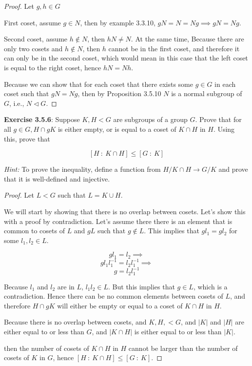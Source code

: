 \documentclass[a4paper]{article}
\begin{document}
\begin{myparindent}{0pt}
\begin{proof}
  Let $g, h \in G$

  First coset, assume $g \in N$, then by example 3.3.10, $gN = N = Ng \implies gN = Ng$.

  Second coset, assume $h \notin N$, then $hN \neq N$. At the same time, Because
  there are only two cosets and $h \notin N$, then $h$ cannot be in the first
  coset, and therefore it can only be in the second coset, which would mean in
  this case that the left coset is equal to the right coset, hence $hN = Nh$. \newline

  Because we can show that for each coset that there exists some $g \in G$ in
  each coset such that $gN = Ng$, then by Proposition 3.5.10 $N$ is a normal
  subgroup of $G$, i.e., $N \triangleleft G$.
\end{proof}

\textbf{Exercise 3.5.6}:
Suppose $K, H < G$ are subgroups of a group $G$. Prove that for all $g \in G,
H \cap gK$ is either empty, or is equal to a coset of $K \cap H$ in $H$. Using
this, prove that

\[ [H ~: ~K \cap H] \le [G ~: ~K] \]

\textit{Hint:} To prove the inequality, define a function from $H/K \cap H
\rightarrow G/K$ and prove that it is well-defined and injective.
\begin{proof}
  Let $L < G$ such that $L = K \cup H$.

  We will start by showing that there is no overlap between cosets. Let's show
  this with a proof by contradiction. Let's assume there there is an element
  that is common to cosets of $L$ and $gL$ such that $g \notin L$.
  This implies that $g l_1 = g l_2$ for some $l_1, l_2 \in L$.

  \[ g l_1 = l_2 \implies \]
  \[ g l_1 l_1^{-1} = l_2 l_1^{-1} \implies \]
  \[ g = l_2 l_1^{-1} \]

  Because $l_1$ and $l_2$ are in $L$, $l_1 l_2 \in L$. But this implies that
  $g \in L$, which is a contradiction. Hence there can be no common elements
  between cosets of $L$, and therefore $H \cap gK$ will either be empty or
  equal to a coset of $K \cap H$ in $H$. \newline

  Because there is no overlap between cosets, and $K, H, < G$, and $|K|$ and
  $|H|$ are either equal to or less than $G$, and $|K \cap H|$ is either equal
  to or less than $|K|$.

  then the number of cosets of $K \cap H$ in $H$ cannot be larger than the
  number of cosets of $K$ in $G$, hence $[H ~: ~K \cap H] \le [G ~: ~K]$.
\end{proof}

\end{myparindent}
\end{document}
